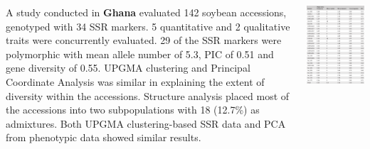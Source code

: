 \documentclass[
  ignorenonframetext,
  aspectratio=169]{beamer}
\newcommand{\bcolumns}{\begin{columns}[T, onlytextwidth]}
\newcommand{\ecolumns}{\end{columns}}
\begin{document}
\begin{frame}{}
\protect\hypertarget{section-2}{}
\bcolumns
{}
\scriptsize

A study conducted in \textbf{Ghana} evaluated 142 soybean accessions,
genotyped with 34 SSR markers. 5 quantitative and 2 qualitative traits
were concurrently evaluated. 29 of the SSR markers were polymorphic with
mean allele number of 5.3, PIC of 0.51 and gene diversity of 0.55. UPGMA
clustering and Principal Coordinate Analysis was similar in explaining
the extent of diversity within the accessions. Structure analysis placed
most of the accessions into two subpopulations with 18 (12.7\%) as
admixtures. Both UPGMA clustering-based SSR data and PCA from phenotypic
data showed similar results\citep{denwar2019genetic}.


\begin{center}\includegraphics[width=0.8\linewidth]{../images/Ghana_soybean_diversity} \end{center}

\ecolumns
\end{frame}
\end{document}
